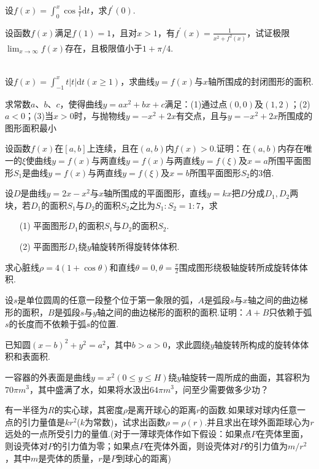 \begin{xiti}
\item 设$f(x)=\int_{0}^{x} \cos \frac{1}{t} \mathrm{d}t$，求$f^{\prime}(0)$.
\item 设函数$f(x)$满足$f(1)=1$，且对$x>1$，有$f^{\prime}(x)=\frac{1}{x^{2}+f^{2}(x)}$，试证极限$\lim _{x \rightarrow \infty} f(x)$存在，且极限值小于$1+\pi / 4$.

\begin{solution}
		\begin{align*}
		\end{align*}
\end{solution}

\item  设$f(x)=\int_{-1}^{x} t|t| \mathrm{d} t(x \geqslant 1)$，求曲线$y=f(x)$与$x$轴所围成的封闭图形的面积.
\item 求常数$a$、$b$、$c$，使得曲线$y=a x^{2}+b x+c$满足：(1)通过点$(0,0)$及$(1,2)$；(2)$a<0$；(3)当$x>0$时，与抛物线$y=-x^{2}+2 x$有交点，且与$y=-x^{2}+2 x$所围成的图形面积最小
\item 设函数$f(x)$在$[a,b]$上连续，且在$(a,b)$内$f(x)>0$.证明：在$(a,b)$内存在唯一的$\xi $使曲线$y=f(x)$与两直线$y=f(x)$与两直线$y=f(\xi )$及$x=a$所围平面图形$S_{1}$是曲线$y=f(x)$与两直线$y=f(\xi )$及$x=b$所围平面图形$S_{2}$的3倍.
\item 设$D$是曲线$y=2 x-x^{2}$与$x$轴所围成的平面图形，直线$y=kx$把$D$分成$D_{1},D_{2}$两块，若$D_{1}$的面积$S_{1}$与$D_{2}$的面积$S_{2}$之比为$S_{1}:S_{2}=1:7$，求
\begin{enumerate}
	\item [(1)] 平面图形$D_{1}$的面积$S_{1}$与$D_{2}$的面积$S_{2}$.
	\item [(2)] 平面图形$D_{1}$绕$y$轴旋转所得旋转体体积.
\end{enumerate}

\item 求心脏线$\rho=4(1+\cos \theta)$和直线$\theta=0, \theta=\frac{\pi}{2}$围成图形绕极轴旋转所成旋转体体积.
\item  设$s$是单位圆周的任意一段整个位于第一象限的弧，$A$是弧段$s$与$x$轴之间的曲边梯形的面积，$B$是弧段$s$与$y$轴之间的曲边梯形的面积的面积.证明：$A+B$只依赖于弧$s$的长度而不依赖于弧$s$的位置.

\item 已知圆$(x-b)^{2}+y^{2}=a^{2}$，其中$b>a>0$，求此圆绕$y$轴旋转所构成的旋转体体积和表面积.

\item 一容器的外表面是曲线$y=x^{2}(0 \leqslant y \leqslant H)$绕$y$轴旋转一周所成的曲面，其容积为$70\pi m^{3}$，其中盛满了水，如果将水汲出$64\pi m^{3}$，问至少需要做多少功？

\item 有一半径为$R$的实心球，其密度$\rho$是离开球心的距离$r$的函数.如果球对球内任意一点的引力量值是$kr^{2}$($k$为常数)，试求出函数$\rho=\rho(r)$.并且求出在球外面距球心为$r$远处的一点所受引力的量值.(对于一薄球壳体作如下假设：如果点$P$在壳体里面，则设壳体对$P$的引力值为零；如果点$P$在壳体外面，则设壳体对$P$的引力值为$m/r^{2}$，其中$m$是壳体的质量，$r$是$P$到球心的距离)
\end{xiti}

